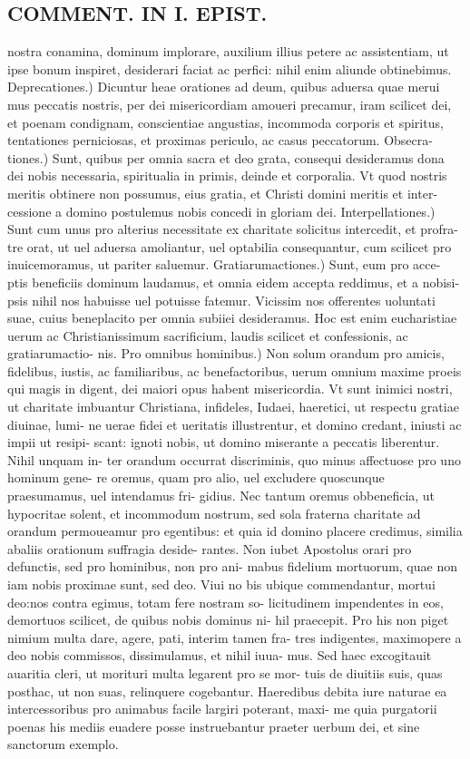 \documentclass{article}
\begin{document}
\begin{pages}
\section*{COMMENT. IN I. EPIST. }
\marginpar{[ p.480 ]}\pstart nostra conamina, dominum implorare, auxilium illius petere ac assistentiam, ut ipse bonum inspiret, desiderari faciat ac perfici: nihil enim aliunde obtinebimus.  \pend\pstart Deprecationes.) Dicuntur heae orationes ad deum, quibus aduersa quae merui mus peccatis nostris, per dei misericordiam amoueri precamur, iram scilicet dei, et poenam condignam, conscientiae angustias, incommoda corporis et spiritus, tentationes perniciosas, et proximas periculo, ac casus peccatorum. Obsecra- tiones.) Sunt, quibus per omnia sacra et deo grata, consequi desideramus dona dei nobis necessaria, spiritualia in primis, deinde et corporalia. Vt quod nostris meritis obtinere non possumus, eius gratia, et Christi domini meritis et inter- cessione a domino postulemus nobis concedi in gloriam dei. Interpellationes.) Sunt cum unus pro alterius necessitate ex charitate solicitus intercedit, et profra- tre orat, ut uel aduersa amoliantur, uel optabilia consequantur, cum scilicet pro inuicemoramus, ut pariter saluemur. Gratiarumactiones.) Sunt, eum pro acce- ptis beneficiis dominum laudamus, et omnia eidem accepta reddimus, et a nobisi- psis nihil nos habuisse uel potuisse fatemur. Vicissim nos offerentes uoluntati suae, cuius beneplacito per omnia subiiei desideramus. Hoc est enim eucharistiae uerum ac Christianissimum sacrificium, laudis scilicet et confessionis, ac gratiarumactio- nis. Pro omnibus hominibus.) Non solum orandum pro amicis, fidelibus, iustis, ac familiaribus, ac benefactoribus, uerum omnium maxime proeis qui magis in digent, dei maiori opus habent misericordia. Vt sunt inimici nostri, ut charitate imbuantur Christiana, infideles, Iudaei, haeretici, ut respectu gratiae diuinae, lumi- ne uerae fidei et ueritatis illustrentur, et domino credant, iniusti ac impii ut resipi- scant: ignoti nobis, ut domino miserante a peccatis liberentur. Nihil unquam in- ter orandum occurrat discriminis, quo minus affectuose pro uno hominum gene- re oremus, quam pro alio, uel excludere quoscunque praesumamus, uel intendamus fri- gidius. Nec tantum oremus obbeneficia, ut hypocritae solent, et incommodum nostrum, sed sola fraterna charitate ad orandum permoueamur pro egentibus: et quia id domino placere credimus, similia abaliis orationum suffragia deside- rantes. Non iubet Apostolus orari pro defunctis, sed pro hominibus, non pro ani- mabus fidelium mortuorum, quae non iam nobis proximae sunt, sed deo. Viui no bis ubique commendantur, mortui deo:nos contra egimus, totam fere nostram so- licitudinem impendentes in eos, demortuos scilicet, de quibus nobis dominus ni- hil praecepit. Pro his non piget nimium multa dare, agere, pati, interim tamen fra- tres indigentes, maximopere a deo nobis commissos, dissimulamus, et nihil iuua- mus. Sed haec excogitauit auaritia cleri, ut morituri multa legarent pro se mor- tuis de diuitiis suis, quas posthac, ut non suas, relinquere cogebantur. Haeredibus debita iure naturae ea intercessoribus pro animabus facile largiri poterant, maxi- me quia purgatorii poenas his mediis euadere posse instruebantur praeter uerbum dei, et sine sanctorum exemplo.  \pend

\end{pages}
\end{document}
